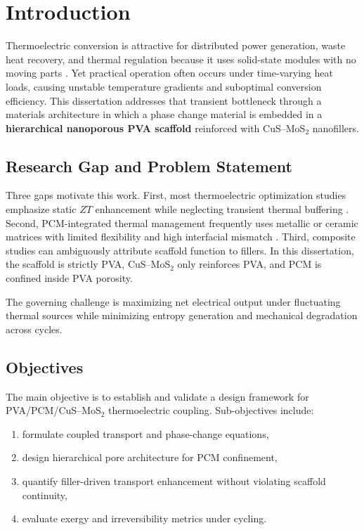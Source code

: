 \chapter{Introduction}\label{ch:intro}

Thermoelectric conversion is attractive for distributed power generation, waste heat recovery, and thermal regulation because it uses solid-state modules with no moving parts \citep{bell2008cooling,snyder2008complex}. Yet practical operation often occurs under time-varying heat loads, causing unstable temperature gradients and suboptimal conversion efficiency. This dissertation addresses that transient bottleneck through a materials architecture in which a phase change material is embedded in a \textbf{hierarchical nanoporous PVA scaffold} reinforced with CuS--MoS$_2$ nanofillers.

\section{Research Gap and Problem Statement}
Three gaps motivate this work. First, most thermoelectric optimization studies emphasize static $ZT$ enhancement while neglecting transient thermal buffering \citep{he2017advances}. Second, PCM-integrated thermal management frequently uses metallic or ceramic matrices with limited flexibility and high interfacial mismatch \citep{zhang2020pcmreview}. Third, composite studies can ambiguously attribute scaffold function to fillers. In this dissertation, the scaffold is strictly PVA, CuS--MoS$_2$ only reinforces PVA, and PCM is confined inside PVA porosity.

The governing challenge is maximizing net electrical output under fluctuating thermal sources while minimizing entropy generation and mechanical degradation across cycles.

\section{Objectives}
The main objective is to establish and validate a design framework for PVA/PCM/CuS--MoS$_2$ thermoelectric coupling. Sub-objectives include:
\begin{enumerate}[label=(\roman*)]
    \item formulate coupled transport and phase-change equations,
    \item design hierarchical pore architecture for PCM confinement,
    \item quantify filler-driven transport enhancement without violating scaffold continuity,
    \item evaluate exergy and irreversibility metrics under cycling.
\end{enumerate}

